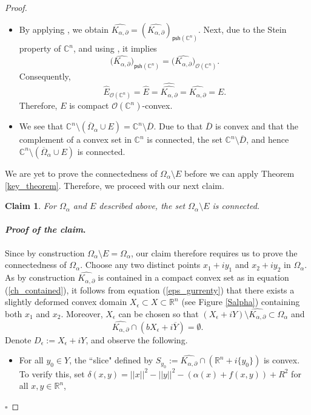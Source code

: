 \documentclass[12pt,reqno, a4paper]{amsart}
\newtheorem{claim}[theorem]{Claim}
\theoremstyle{definition}
\newenvironment{claimproof}{\paragraph{\textit{Proof of the claim}.}}{\hfill$\square$}
\theoremstyle{definition}
\numberwithin{equation}{section}
\def\R{\mathbb{R}}                              %
\def\C{\mathbb{C}}                              %
\def\eps{\epsilon}
\begin{document}
\begin{proof}
\begin{itemize}
\item[(ii)] By applying \cite[Theorem 1.3.11]{stout}, we obtain  $\widehat{K_{\alpha,\partial}}=(\widehat{K_{\alpha,\partial}})_{\mathsf{psh}(\C^n)}.$ Next, due to the Stein property of $\C^n$, and using \cite[Proposition 2.7.7]{JP1}, it implies  $$\big(\widehat{K_{\alpha,\partial}}\big)_{\mathsf{psh}(\C^n)}=\big(\widehat{K_{\alpha,\partial}}\big)_{\mathcal{O}(\C^n)}.$$ Consequently, $$\widehat{E}_{\mathcal{O}(\C^n)}=\widehat{E}=\widehat{\widehat{K_{\alpha,\partial}}}=\widehat{K_{\alpha,\partial}}=E.$$
Therefore, $E$ is compact $\mathcal{O}(\C^n)$-convex. \\

\item[(iii)] We see that $\C^n\setminus (\overline{\Omega}_{\alpha}\cup E)= \C^n\setminus \overline{D}$. Due to that $\overline{D}$ is convex and that the complement of a convex set in $\C^n$ is connected, the set $\C^n\setminus \overline{D}$, and hence $\C^n\setminus (\overline{\Omega}_{\alpha}\cup E)$ is connected.
\end{itemize}
We are yet to prove the connectedness of $\Omega_{\alpha}\setminus E$ before we can apply Theorem \ref{key_theorem}. Therefore, we proceed with our next claim.
\begin{claim}\label{claim_ctd}
For $\Omega_{\alpha}$ and $E$ described above, the set $\Omega_{\alpha}\setminus E$ is connected.
\end{claim}
\begin{claimproof}
Since by construction $\Omega_{\alpha}\setminus E=\Omega_{\alpha}$, our claim therefore requires us to prove the connectedness of $\Omega_{\alpha}$. Choose any two distinct points $x_1+iy_1$ and $x_2+iy_2$ in $\Omega_{\alpha}$. As by construction $\widehat{K_{\alpha,\partial}}$ is contained in a compact convex set as in equation (\ref{ch_contained}), it follows from equation (\ref{eps_gurrenty}) that there exists a slightly deformed convex domain $X_{\epsilon}\subset X\subset \R^n$ (see Figure \ref{Salpha}) containing both $x_1$ and $x_2$. Moreover, $X_{\eps}$ can be chosen so that $( X_{\epsilon}+i{Y})\setminus\widehat{K_{\alpha,\partial}} \subset \Omega_{\alpha}$ and 
\begin{equation}\label{deformed_k_cond}
\widehat{K_{\alpha,\partial}} \cap (bX_{\epsilon}+i\overline{Y})=\emptyset.
\end{equation}
Denote $D_{\eps}:=X_{\epsilon}+i{Y}$, and  observe the following.
\begin{itemize}
\item[(i)] For all $y_0\in Y$, the ``{slice}" defined by $S_{y_0}:=\widehat{K_{\alpha,\partial}}\cap (\R^n+i\{y_0\})$ is convex. To verify this, set ${\delta(x,y)=||x||^2-||y||^2-(\alpha(x)+f(x,y))+R^2}$ for all $x,y \in \R^n$,

\end{itemize}
\end{claimproof}
\end{proof}
\end{document}
